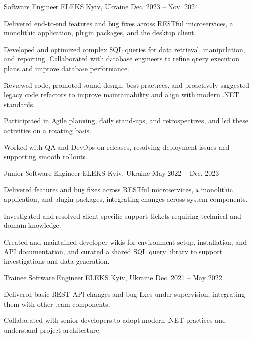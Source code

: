 \begin{cventries}
  \cventry
    {Software Engineer} %
    {ELEKS} %
    {Kyiv, Ukraine} %
    {Dec. 2023 – Nov. 2024} %
    {
      \begin{cvitems} %
        \item {Delivered end-to-end features and bug fixes across RESTful microservices, a monolithic application, plugin packages, and the desktop client.}
        \item {Developed and optimized complex SQL queries for data retrieval, manipulation, and reporting. Collaborated with database engineers to refine query execution plans and improve database performance.}
        \item {Reviewed code, promoted sound design, best practices, and proactively suggested legacy code refactors to improve maintainability and align with modern .NET standards.}
        \item {Participated in Agile planning, daily stand-ups, and retrospectives, and led these activities on a rotating basis.}
        \item {Worked with QA and DevOps on releases, resolving deployment issues and supporting smooth rollouts.}
      \end{cvitems}
    }

  \cventry
    {Junior Software Engineer} %
    {ELEKS} %
    {Kyiv, Ukraine} %
    {May 2022 – Dec. 2023} %
    {
      \begin{cvitems} %
        \item {Delivered features and bug fixes across RESTful microservices, a monolithic application, and plugin packages, integrating changes across system components.}
        \item {Investigated and resolved client-specific support tickets requiring technical and domain knowledge.}
        \item {Created and maintained developer wikis for environment setup, installation, and API documentation, and curated a shared SQL query library to support investigations and data generation.}
      \end{cvitems}
    }

  \cventry
    {Trainee Software Engineer} %
    {ELEKS} %
    {Kyiv, Ukraine} %
    {Dec. 2021 – May 2022} %
    {
      \begin{cvitems} %
        \item {Delivered basic REST API changes and bug fixes under supervision, integrating them with other team components.}
        \item {Collaborated with senior developers to adopt modern .NET practices and understand project architecture.}
      \end{cvitems}
    }


\end{cventries}

